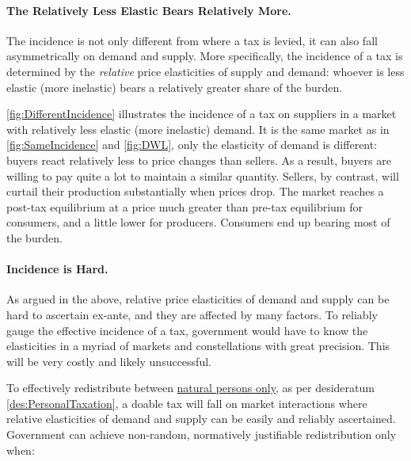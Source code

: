 \paragraph{The Relatively Less Elastic Bears Relatively More.} The incidence is not only different from where a tax is levied, it can also fall asymmetrically on demand and supply. More specifically, the incidence of a tax is determined by the \emph{relative} price elasticities of supply and demand: whoever is less elastic (more inelastic) bears a relatively greater share of the burden.

\autoref{fig:DifferentIncidence} illustrates the incidence of a tax on suppliers in a market with relatively less elastic (more inelastic) demand. It is the same market as in \autoref{fig:SameIncidence} and \ref{fig:DWL}, only the elasticity of demand is different: buyers react relatively less to price changes than sellers. As a result, buyers are willing to pay quite a lot to maintain a similar quantity. Sellers, by contrast, will curtail their production substantially when prices drop. The market reaches a post-tax equilibrium at a price much greater than pre-tax equilibrium for consumers, and a little lower for producers. Consumers end up bearing most of the burden.



\paragraph{Incidence is Hard.} As argued in the above, relative price elasticities of demand and supply can be hard to ascertain ex-ante, and they are affected by many factors. To reliably gauge the effective incidence of a tax, government would have to know the elasticities in a myriad of markets and constellations with great precision. This will be very costly and likely unsuccessful.
	

To effectively redistribute between \href{des:PersonalTaxation}{natural persons only}, as per desideratum \ref{des:PersonalTaxation}, a doable tax will fall on market interactions where relative elasticities of demand and supply can be easily and reliably ascertained. Government can achieve non-random, normatively justifiable redistribution only when:

